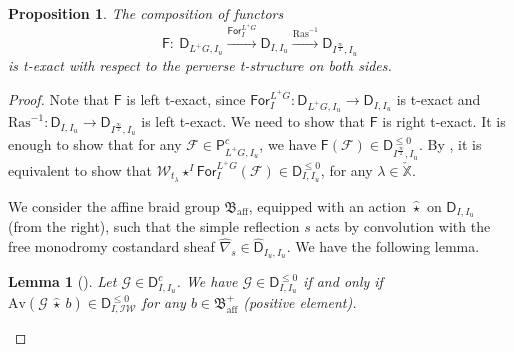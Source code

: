\documentclass[11pt]{amsart}
\numberwithin{equation}{section}
\theoremstyle{plain}
\newtheorem{lem}[thm]{Lemma}
\newtheorem{prop}[thm]{Proposition}
\theoremstyle{definition}
\newcommand{\D}{{\mathsf D}}
\newcommand{\sF}{{\mathcal F}}
\newcommand{\sG}{{\mathcal G}}
\renewcommand{\P}{{\mathsf P}}
\newcommand{\sW}{{\mathcal W}}
\newcommand{\X}{{\mathbb X}}
\newcommand{\Xd}{\check{\X}}
\newcommand{\For}{\mathsf{For}}
\newcommand{\semi}{{{\frac{\infty}{2}}}}
\newcommand{\Av}{\mathrm{Av}}
\newcommand{\IW}{\mathcal{IW}}
\newcommand{\af}{\mathrm{aff}}
\begin{document}
\begin{prop}
The composition of functors 
\[
\mathsf{F}:\ \D_{L^+G,I_u}\xrightarrow{\For^{L^+G}_I} \D_{I,I_u} \xrightarrow{\mathrm{Ras}^{-1}} \D_{I^\semi,I_u}
\] 
is t-exact with respect to the perverse t-structure on both sides. 
\end{prop}
\begin{proof}
Note that $\mathsf{F}$ is left t-exact, since $\For^{L^+G}_I:\D_{L^+G,I_u}\rightarrow \D_{I,I_u}$ is t-exact and $\mathrm{Ras}^{-1}:\D_{I,I_u}\rightarrow \D_{I^\semi,I_u}$ is left t-exact. 
We need to show that $\mathsf{F}$ is right t-exact. 
It is enough to show that for any $\sF\in \P^c_{L^+G,I_u}$, we have $\mathsf{F}(\sF)\in \D^{\leq 0}_{I^\semi,I_u}$. 
By \cite[Lem 6.11]{adr}, it is equivalent to show that $\sW_{t_\lambda}\star^I \For^{L^+G}_I(\sF)\in \D^{\leq 0}_{I,I_u}$, for any $\lambda\in \Xd$. 

We consider the affine braid group $\mathfrak{B}_\af$, equipped with an action $\widehat{\star}$ on $\D_{I,I_u}$ (from the right), such that the simple reflection $s$ acts by convolution with the free monodromy costandard sheaf $\widehat{\nabla}_s\in \widehat{\D}_{I_u,I_u}$. 
We have the following lemma. 
\begin{lem}[{\cite[Prop 3]{BLin}}]\label{lem 1.2}
Let $\sG\in \D^c_{I,I_u}$. 
We have $\sG\in \D^{\leq 0}_{I,I_u}$ if and only if $\Av(\sG\ \widehat{\star}\ b)\in \D^{\leq 0}_{I,\IW}$ for any $b\in \mathfrak{B}^+_\af$ (positive element). 
\end{lem}


\end{proof}
\end{document}
